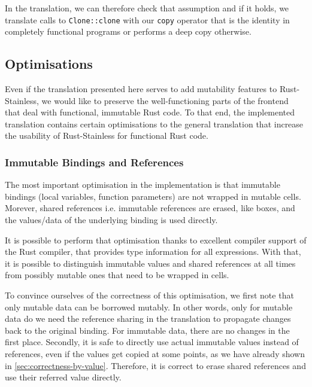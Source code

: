 In the translation, we can therefore check that assumption and if it
holds, we translate calls to \passthrough{\lstinline!Clone::clone!} with
our \passthrough{\lstinline!copy!} operator that is the identity in
completely functional programs or performs a deep copy otherwise.




\subsection{Optimisations}
\label{optimisations}

Even if the translation presented here serves to add mutability features to
Rust-Stainless, we would like to preserve the well-functioning parts of the
frontend that deal with functional, immutable Rust code. To that end, the
implemented translation contains certain optimisations to the general
translation that increase the usability of Rust-Stainless for functional Rust
code.


\subsubsection{Immutable Bindings and References}

The most important optimisation in the implementation is that immutable bindings
(local variables, function parameters) are not wrapped in mutable cells.
Morever, shared references i.e. immutable references are erased, like boxes, and
the values/data of the underlying binding is used directly.

It is possible to perform that optimisation thanks to excellent compiler support
of the Rust compiler, that provides type information for all expressions. With
that, it is  possible to distinguish immutable values and shared references at
all times from  possibly mutable ones that need to be wrapped in cells.

To convince ourselves of the correctness of this optimisation, we first note
that only mutable data can be borrowed mutably. In other words, only for mutable
data do we need the reference sharing in the translation to propagate changes
back to the original binding. For immutable data, there are no changes in the
first place. Secondly, it is safe to directly use actual immutable values
instead of references, even if the values get copied at some points, as we have
already shown in \autoref{sec:correctness-by-value}. Therefore, it is correct to
erase shared references and use their referred value directly.

